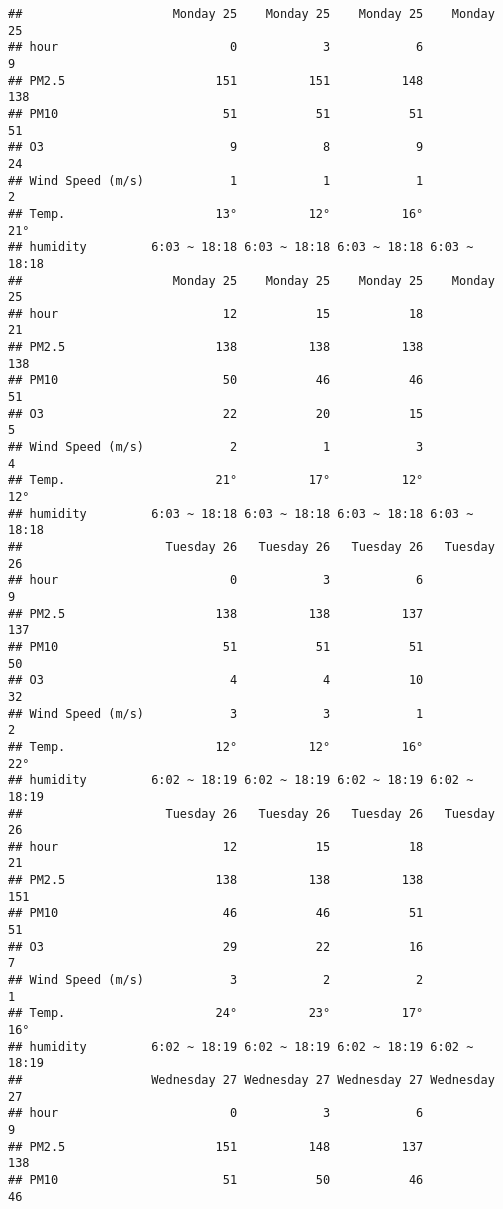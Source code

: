 \documentclass[
]{article}
\begin{document}
\begin{verbatim}
##                     Monday 25    Monday 25    Monday 25    Monday 25
## hour                        0            3            6            9
## PM2.5                     151          151          148          138
## PM10                       51           51           51           51
## O3                          9            8            9           24
## Wind Speed (m/s)            1            1            1            2
## Temp.                     13°          12°          16°          21°
## humidity         6:03 ~ 18:18 6:03 ~ 18:18 6:03 ~ 18:18 6:03 ~ 18:18
##                     Monday 25    Monday 25    Monday 25    Monday 25
## hour                       12           15           18           21
## PM2.5                     138          138          138          138
## PM10                       50           46           46           51
## O3                         22           20           15            5
## Wind Speed (m/s)            2            1            3            4
## Temp.                     21°          17°          12°          12°
## humidity         6:03 ~ 18:18 6:03 ~ 18:18 6:03 ~ 18:18 6:03 ~ 18:18
##                    Tuesday 26   Tuesday 26   Tuesday 26   Tuesday 26
## hour                        0            3            6            9
## PM2.5                     138          138          137          137
## PM10                       51           51           51           50
## O3                          4            4           10           32
## Wind Speed (m/s)            3            3            1            2
## Temp.                     12°          12°          16°          22°
## humidity         6:02 ~ 18:19 6:02 ~ 18:19 6:02 ~ 18:19 6:02 ~ 18:19
##                    Tuesday 26   Tuesday 26   Tuesday 26   Tuesday 26
## hour                       12           15           18           21
## PM2.5                     138          138          138          151
## PM10                       46           46           51           51
## O3                         29           22           16            7
## Wind Speed (m/s)            3            2            2            1
## Temp.                     24°          23°          17°          16°
## humidity         6:02 ~ 18:19 6:02 ~ 18:19 6:02 ~ 18:19 6:02 ~ 18:19
##                  Wednesday 27 Wednesday 27 Wednesday 27 Wednesday 27
## hour                        0            3            6            9
## PM2.5                     151          148          137          138
## PM10                       51           50           46           46

\end{verbatim}
\end{document}
